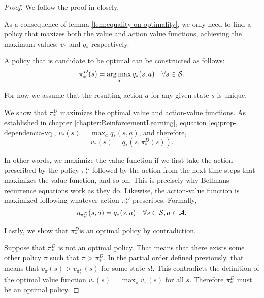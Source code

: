 \begin{proof}
    We follow the proof in \cite[Pg.~115]{raoRL4F} closely.

    As a consequence of lemma \ref{lem:equality-on-optimality}, we only need to
    find a policy that maxizes both the value and action value functions,
    achieving the maximum values: $v_*$ and $q_*$ respectively.

    A policy that is candidate to be optimal can be constructed as follows:
    \begin{equation*}
        \pi_{*}^{D} (s) = \operatorname*{arg\,max}_{a} q_{*} (s, a) \quad \forall s \in \mathcal{S}.
    \end{equation*}

    For now we assume that the resulting action $a$ for any given state $s$ is
    unique.

    We show that $\pi_{*}^{D}$ maximizes the optimal value and action-value functions. As established in chapter \ref{chapter:ReinforcementLearning}, equation \eqref{eq:prop-dependencia-vq}, $v_* (s) = \max_a q_* (s, a)$, and therefore,
    \begin{equation*}
        v_* (s) = q_* (s, \pi_{*}^{D}(s)).
    \end{equation*}

    In other words, we maximize the value function if we first take the action
    prescribed by the policy $\pi_{*}^{D}$ followed by the action from the next
    time steps that maximizes the value function, and so on. This is precisely
    why Bellmans recurrence equations work as they do. Likewise, the
    action-value function is maximized following whatever action $\pi_{*}^{D}$
    prescribes. Formally,
    \begin{equation*}
        q_{\pi_{*}^{D}} (s, a) = q_* (s,a) \quad \forall s \in \mathcal{S}, a \in \mathcal{A}.
    \end{equation*}

    Lastly, we show that $\pi_{*}^{D}$is an optimal policy by contradiction.

    Suppose that $\pi_{*}^{D}$ is not an optimal policy. That means that there
    exists some other policy $\pi$ such that $\pi > \pi_{*}^{D}$. In the partial
    order defined previously, that means that $v_{\pi} (s) > v_{\pi_{*}^{D}}
    (s)$ for some state $s$!. This contradicts the definition of the
    optimal value function $v_* (s) = \max_\pi v_\pi (s)$ for all $s$. Therefore
    $\pi_{*}^{D}$ must be an optimal policy.
\end{proof}


